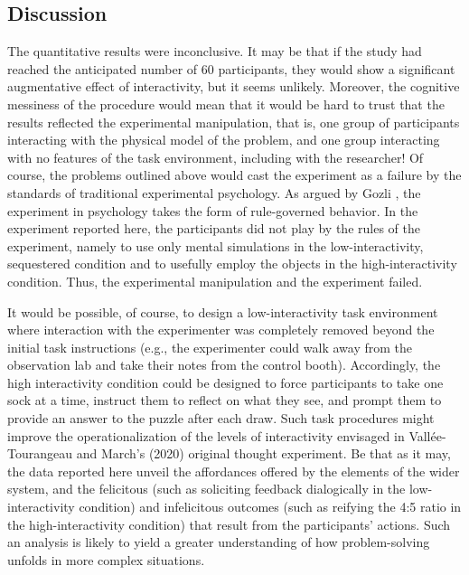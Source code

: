 \documentclass{article}
\begin{document}
\begin{table}
\begin{tabular}{c  c  c}
\end{tabular}


\end{table}
\subsection{}

\subsection{Discussion}

The quantitative results were inconclusive. It may be that if the study had reached the anticipated number of 60 participants, they would show a significant augmentative effect of interactivity, but it seems unlikely. Moreover, the cognitive messiness of the procedure would mean that it would be hard to trust that the results reflected the experimental manipulation, that is, one group of participants interacting with the physical model of the problem, and one group interacting with no features of the task environment, including with the researcher! Of course, the problems outlined above would cast the experiment as a failure by the standards of traditional experimental psychology. As argued by Gozli \parencite{Gozli2017}, the experiment in psychology takes the form of rule-governed behavior. In the experiment reported here, the participants did not play by the rules of the experiment, namely to use only mental simulations in the low-interactivity, sequestered condition and to usefully employ the objects in the high-interactivity condition. Thus, the experimental manipulation and the experiment failed. 

It would be possible, of course, to design a low-interactivity task environment where interaction with the experimenter was completely removed beyond the initial task instructions (e.g., the experimenter could walk away from the observation lab and take their notes from the control booth). Accordingly, the high interactivity condition could be designed to force participants to take one sock at a time, instruct them to reflect on what they see, and prompt them to provide an answer to the puzzle after each draw. Such task procedures might improve the operationalization of the levels of interactivity envisaged in Vallée-Tourangeau and March's (2020) original thought experiment. Be that as it may, the data reported here unveil the affordances offered by the elements of the wider system, and the felicitous (such as soliciting feedback dialogically in the low-interactivity condition) and infelicitous outcomes (such as reifying the 4:5 ratio in the high-interactivity condition) that result from the participants' actions. Such an analysis is likely to yield a greater understanding of how problem-solving unfolds in more complex situations. 
\end{document}
